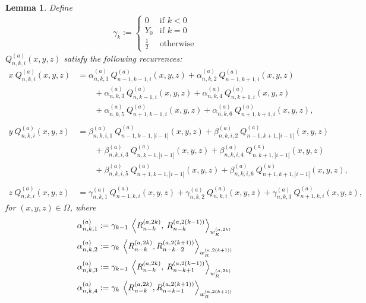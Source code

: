 \documentclass[11pt, oneside]{article}   	%
\newcommand{\half}{\frac{1}{2}}
\newcommand{\genjac}{R}
\newcommand{\genjacnmk}{\genjac_{n-k}}
\newcommand{\genjacw}{w_\genjac}
\newcommand{\scop}{Q}
\newcommand{\scopnki}{\scop_{n,k,i}}
\newcommand{\scopa}{\scop^{(a)}}
\newcommand{\scopnkia}{\scopnki^{(a)}}
\newcommand{\ch}{Y}
\newcommand{\alphaa}{\alpha^{(a)}}
\newcommand{\betaa}{\beta^{(a)}}
\newcommand{\gammaa}{\gamma^{(a)}}
\newtheorem{lemma}{Lemma}
\begin{document}
\begin{lemma}\label{lemma:Qrecurrence} 
Define
\begin{align}
	\gamma_{k} :=
		\begin{cases}
			0 &\text{if } k < 0 \\
			\ch_0 &\text{if } k = 0 \\
			\half &\text{otherwise}
		\end{cases}
\end{align}
$\scopnkia(x,y,z)$ satisfy the following recurrences:
\begin{align*}
	x \: \scopnkia(x,y,z) &= \alphaa_{n,k,1} \:  \scopa_{n-1, k-1, i}(x, y, z) + \alphaa_{n,k,2} \:  \scopa_{n-1, k+1, i}(x, y, z) \nonumber \\
		& \quad \quad + \alphaa_{n,k,3} \:  \scopa_{n, k-1, i}(x, y, z) + \alphaa_{n,k,4} \:  \scopa_{n, k+1, i}(x, y, z) \nonumber \\
		& \quad \quad + \alphaa_{n,k,5} \:  \scopa_{n+1, k-1, i}(x, y, z) + \alphaa_{n,k,6} \:  \scopa_{n+1, k+1, i}(x, y, z), \\ \\
	y \: \scopnkia(x,y,z) &= \betaa_{n,k,i,1} \:  \scopa_{n-1, k-1, |i-1|}(x, y, z) + \betaa_{n,k,i,2} \:  \scopa_{n-1, k+1, |i-1|}(x, y, z) \nonumber \\
		& \quad \quad + \betaa_{n,k,i,3} \:  \scopa_{n, k-1, |i-1|}(x, y, z) + \betaa_{n,k,i,4} \:  \scopa_{n, k+1, |i-1|}(x, y, z) \nonumber \\
		& \quad \quad + \betaa_{n,k,i,5} \:  \scopa_{n+1, k-1, |i-1|}(x, y, z) + \betaa_{n,k,i,6} \:  \scopa_{n+1, k+1, |i-1|}(x, y, z), \\ \\
	z \: \scopnkia(x,y,z) &= \gammaa_{n,k,1} \: \scopa_{n-1, k, i}(x, y, z) + \gammaa_{n,k,2} \: \scopa_{n, k, i}(x, y, z) + \gammaa_{n,k,3} \: \scopa_{n+1, k, i}(x, y, z),
\end{align*}
for $(x,y,z) \in \Omega$, where
\begin{align*}
	\alphaa_{n,k,1} &:= \gamma_{k-1} \: \ip<\genjacnmk^{(a, 2k)}, \: \genjacnmk^{(a, 2(k-1))}>_{\genjacw^{(a, 2k)}} \\
	\alphaa_{n,k,2} &:= \gamma_{k} \: \ip<\genjacnmk^{(a, 2k)}, \genjac_{n-k-2}^{(a, 2(k+1))}>_{\genjacw^{(a, 2(k+1))}} \\
	\alphaa_{n,k,3} &:=\gamma_{k-1} \: \ip<\genjacnmk^{(a, 2k)}, \: \genjac_{n-k+1}^{(a, 2(k-1))}>_{\genjacw^{(a, 2k)}} \\
	\alphaa_{n,k,4} &:= \gamma_{k} \: \ip<\genjacnmk^{(a, 2k)}, \genjac_{n-k-1}^{(a, 2(k+1))}>_{\genjacw^{(a, 2(k+1))}} \\

\end{align*}
\end{lemma}
\end{document}
